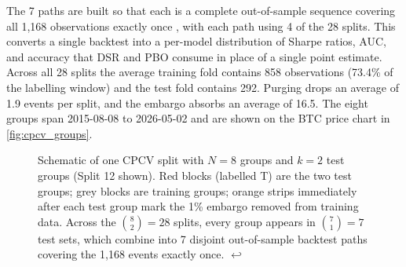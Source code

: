 The 7 paths are built so that each is a complete out-of-sample sequence covering all 1,168 observations exactly once \citep[Section 12.4.1]{lopez_de_prado_2018}, with each path using 4 of the 28 splits. This converts a single backtest into a per-model distribution of Sharpe ratios, AUC, and accuracy that DSR and PBO consume in place of a single point estimate. Across all 28 splits the average training fold contains 858 observations (73.4\% of the labelling window) and the test fold contains 292. Purging drops an average of 1.9 events per split, and the embargo absorbs an average of 16.5. The eight groups span 2015-08-08 to 2026-05-02 and are shown on the BTC price chart in \label{ref:cpcv_groups_call}\autoref{fig:cpcv_groups}.


\begin{figure}[H]
\centering
{}
\caption{Schematic of one CPCV split with $N = 8$ groups and $k = 2$ test groups (Split 12 shown). Red blocks (labelled T) are the two test groups; grey blocks are training groups; orange strips immediately after each test group mark the 1\% embargo removed from training data. Across the $\binom{8}{2} = 28$ splits, every group appears in $\binom{7}{1} = 7$ test sets, which combine into 7 disjoint out-of-sample backtest paths covering the 1{,}168 events exactly once. \protect\hyperref[ref:cpcv_schematic_call]{$\hookleftarrow$}}
\label{fig:cpcv_schematic}
\end{figure}


